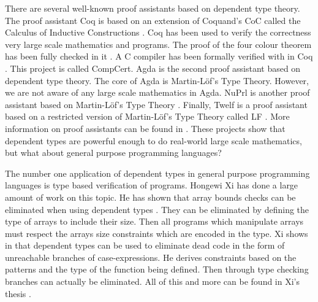 \documentclass{article}
\begin{document}
There are several well-known proof assistants based on dependent type
theory.  The proof assistant Coq is based on an extension of Coquand's
CoC called the Calculus of Inductive Constructions
\cite{CoqRefMan:2008}.  Coq has been used to verify the correctness
very large scale mathematics and programs.  The proof of the four
colour theorem has been fully checked in it \cite{Gonthier:2005}.  A C
compiler has been formally verified with in Coq
\cite{Leroy:2009,Leroy:2006}.  This project is called CompCert.  Agda
is the second proof assistant based on dependent type theory.  The
core of Agda is Martin-L\"of's Type Theory.  However, we are not aware
of any large scale mathematics in Agda.  NuPrl is another proof
assistant based on Martin-L\"of's Type Theory \cite{Constable:1986}.
Finally, Twelf is a proof assistant based on a restricted version of
Martin-L\"of's Type Theory called LF \cite{Pfenning:1999}.  More
information on proof assistants can be found in \cite{Geuvers:2009}.
These projects show that dependent types are powerful enough to do
real-world large scale mathematics, but what about general purpose
programming languages?

The number one application of dependent types in general purpose
programming languages is type based verification of programs.  Hongewi
Xi has done a large amount of work on this topic.  He has shown that
array bounds checks can be eliminated when using dependent types
\cite{Xi:1998}.  They can be eliminated by defining the type of arrays
to include their size.  Then all programs which manipulate arrays must
respect the arrays size constraints which are encoded in the type.  Xi
shows in \cite{Xi:1999c} that dependent types can be used to eliminate
dead code in the form of unreachable branches of case-expressions.  He
derives constraints based on the patterns and the type of the function
being defined.  Then through type checking branches can actually be
eliminated.  All of this and more can be found in Xi's thesis
\cite{Xi:1999a}.  
\end{document}
